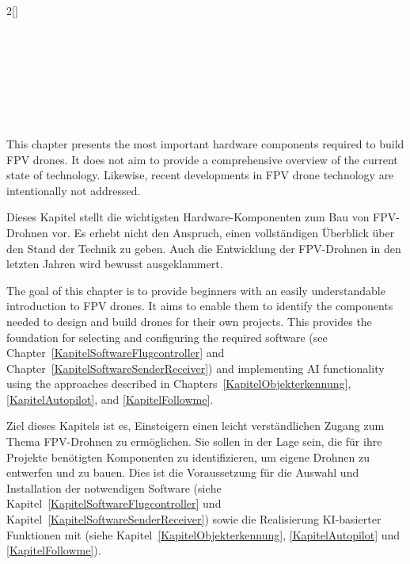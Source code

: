 \begin{paracol}{2}[]

{\raggedright\huge\bfseries\sffamily \englischertitel \par\ } \\[1.8ex]

\switchcolumn

{\raggedright\huge\bfseries\sffamily \deutschertitel \par\ } \\[1.8ex]

\coleng

This chapter presents the most important hardware components required to build FPV drones. It does not aim to provide a comprehensive overview of the current state of technology. Likewise, recent developments in FPV drone technology are intentionally not addressed.


\colger

Dieses Kapitel stellt die wichtigsten Hardware-Komponenten zum Bau von FPV-Drohnen vor. Es erhebt nicht den Anspruch, einen vollständigen Überblick über den Stand der Technik zu geben. Auch die Entwicklung der FPV-Drohnen in den letzten Jahren wird bewusst ausgeklammert.

\coleng

The goal of this chapter is to provide beginners with an easily understandable introduction to FPV drones. It aims to enable them to identify the components needed to design and build drones for their own projects. This provides the foundation for selecting and configuring the required software (see Chapter~\ref{KapitelSoftwareFlugcontroller} and Chapter~\ref{KapitelSoftwareSenderReceiver}) and implementing AI functionality using the approaches described in Chapters~\ref{KapitelObjekterkennung}, \ref{KapitelAutopilot}, and \ref{KapitelFollowme}.

\colger

Ziel dieses Kapitels ist es, Einsteigern einen leicht verständlichen Zugang zum Thema FPV-Drohnen zu ermöglichen. Sie sollen in der Lage sein, die für ihre Projekte benötigten Komponenten zu identifizieren, um eigene Drohnen zu entwerfen und zu bauen. Dies ist die Voraussetzung für die Auswahl und Installation der notwendigen Software (siehe Kapitel~\ref{KapitelSoftwareFlugcontroller} und Kapitel~\ref{KapitelSoftwareSenderReceiver}) sowie die Realisierung KI-basierter Funktionen mit (siehe Kapitel~\ref{KapitelObjekterkennung}, \ref{KapitelAutopilot} und \ref{KapitelFollowme}).

\coleng


\end{paracol}
